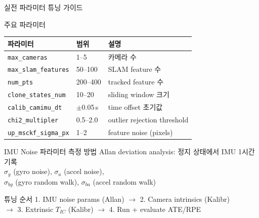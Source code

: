 \begin{frame}[shrink=10]{실전 파라미터 튜닝 가이드}
  \begin{block}{주요 파라미터}
    \begin{tabular}{lll}
      \textbf{파라미터} & \textbf{범위} & \textbf{설명} \\\hline
      \texttt{max\_cameras} & 1--5 & 카메라 수 \\
      \texttt{max\_slam\_features} & 50--100 & SLAM feature 수 \\
      \texttt{num\_pts} & 200--400 & tracked feature 수 \\
      \texttt{clone\_states\_num} & 10--20 & sliding window 크기 \\
      \texttt{calib\_camimu\_dt} & $\pm$0.05\,s & time offset 초기값 \\
      \texttt{chi2\_multipler} & 0.5--2.0 & outlier rejection threshold \\
      \texttt{up\_msckf\_sigma\_px} & 1--2 & feature noise (pixels) \\
    \end{tabular}
  \end{block}
  \begin{block}{IMU Noise 파라미터 측정 방법}
    Allan deviation analysis: 정지 상태에서 IMU 1시간 기록\\
    $\sigma_g$ (gyro noise), $\sigma_a$ (accel noise),\\
    $\sigma_{bg}$ (gyro random walk), $\sigma_{ba}$ (accel random walk)
  \end{block}
  \begin{exampleblock}{튜닝 순서}
    1. IMU noise params (Allan) $\to$ 2. Camera intrinsics (Kalibr)\\
    $\to$ 3. Extrinsic $T_{IC}$ (Kalibr) $\to$ 4. Run + evaluate ATE/RPE
  \end{exampleblock}
\end{frame}


